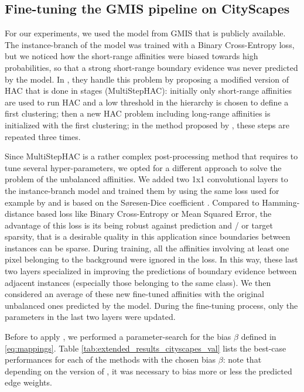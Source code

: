 \subsection{Fine-tuning the GMIS pipeline on CityScapes} \label{sec:appendix_cityscapes}
For our experiments, we used the model from GMIS \cite{liu2018affinity} that is publicly available. The instance-branch of the model was trained with a Binary Cross-Entropy loss, but we noticed how the short-range affinities were biased towards high probabilities, so that a strong short-range boundary evidence was never predicted by the model. In \cite{liu2018affinity}, they handle this problem by proposing a modified version of HAC that is done in stages (MultiStepHAC): initially only short-range affinities are used to run HAC and a low threshold in the hierarchy is chosen to define a first clustering; then a new HAC problem including long-range affinities is  initialized with the first clustering; in the method proposed by \cite{liu2018affinity}, these steps are repeated three times. 

Since MultiStepHAC is a rather complex post-processing method that requires to tune several hyper-parameters, we opted for a different approach to solve the problem of the unbalanced affinities. We added two 1x1 convolutional layers to the instance-branch model and trained them by using the same loss used for example by \cite{wolf2018mutex} and is based on the S\o resen-Dice coefficient \cite{dice1945measures,sorensen1948method}. Compared to Hamming-distance based loss like Binary Cross-Entropy or Mean Squared Error, the advantage of this loss is its being robust against prediction and / or target sparsity, that is a desirable quality in this application since boundaries between instances can be sparse. 
During training, all the affinities involving at least one pixel belonging to the background were ignored in the loss. In this way, these last two layers specialized in improving the predictions of boundary evidence between adjacent instances (especially those belonging to the same class). We then considered an average of these new fine-tuned affinities with the original unbalanced ones predicted by the model. During the fine-tuning process, only the parameters in the last two layers were updated.

Before to apply \algname{}, we performed a parameter-search for the bias $\beta$ defined in \ref{eq:mappings}. Table \ref{tab:extended_results_cityscapes_val} lists the best-case performances for each of the methods with the chosen bias $\beta$: note that depending on the version of \algname{}, it was necessary to bias more or less the predicted edge weights.


